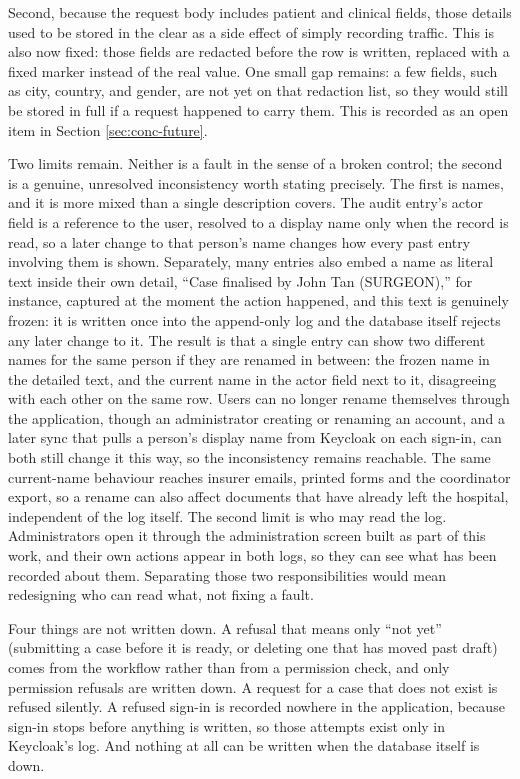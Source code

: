 Second, because the request body includes patient and clinical fields, those details used to be stored in the clear as a side effect of simply recording traffic. This is also now fixed: those fields are redacted before the row is written, replaced with a fixed marker instead of the real value. One small gap remains: a few fields, such as city, country, and gender, are not yet on that redaction list, so they would still be stored in full if a request happened to carry them. This is recorded as an open item in Section \ref{sec:conc-future}.

Two limits remain. Neither is a fault in the sense of a broken control; the second is a genuine, unresolved inconsistency worth stating precisely. The first is names, and it is more mixed than a single description covers. The audit entry's actor field is a reference to the user, resolved to a display name only when the record is read, so a later change to that person's name changes how every past entry involving them is shown. Separately, many entries also embed a name as literal text inside their own detail, ``Case finalised by John Tan (SURGEON),'' for instance, captured at the moment the action happened, and this text is genuinely frozen: it is written once into the append-only log and the database itself rejects any later change to it. The result is that a single entry can show two different names for the same person if they are renamed in between: the frozen name in the detailed text, and the current name in the actor field next to it, disagreeing with each other on the same row. Users can no longer rename themselves through the application, though an administrator creating or renaming an account, and a later sync that pulls a person's display name from Keycloak on each sign-in, can both still change it this way, so the inconsistency remains reachable. The same current-name behaviour reaches insurer emails, printed forms and the coordinator export, so a rename can also affect documents that have already left the hospital, independent of the log itself. The second limit is who may read the log. Administrators open it through the administration screen built as part of this work, and their own actions appear in both logs, so they can see what has been recorded about them. Separating those two responsibilities would mean redesigning who can read what, not fixing a fault.

Four things are not written down. A refusal that means only ``not yet'' (submitting a case before it is ready, or deleting one that has moved past draft) comes from the workflow rather than from a permission check, and only permission refusals are written down. A request for a case that does not exist is refused silently. A refused sign-in is recorded nowhere in the application, because sign-in stops before anything is written, so those attempts exist only in Keycloak's log. And nothing at all can be written when the database itself is down.

